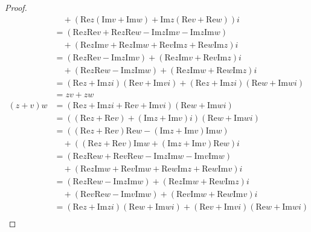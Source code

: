 \documentclass[dvipdfmx]{jsarticle}
\begin{document}
\begin{proof}
\begin{align*}
&\quad + \left( \mathrm{Re}z\left( \mathrm{Im}v + \mathrm{Im}w \right) + \mathrm{Im}z\left( \mathrm{Re}v + \mathrm{Re}w \right) \right)i\\
&= \left( \mathrm{Re}z\mathrm{Re}v + \mathrm{Re}z\mathrm{Re}w - \mathrm{Im}z\mathrm{Im}v - \mathrm{Im}z\mathrm{Im}w \right) \\
&\quad + \left( \mathrm{Re}z\mathrm{Im}v + \mathrm{Re}z\mathrm{Im}w + \mathrm{Re}v\mathrm{Im}z + \mathrm{Re}w\mathrm{Im}z \right)i\\
&= \left( \mathrm{Re}z\mathrm{Re}v - \mathrm{Im}z\mathrm{Im}v \right) + \left( \mathrm{Re}z\mathrm{Im}v + \mathrm{Re}v\mathrm{Im}z \right)i \\
&\quad + \left( \mathrm{Re}z\mathrm{Re}w - \mathrm{Im}z\mathrm{Im}w \right) + \left( \mathrm{Re}z\mathrm{Im}w + \mathrm{Re}w\mathrm{Im}z \right)i\\
&= \left( \mathrm{Re}z + \mathrm{Im}zi \right)\left( \mathrm{Re}v + \mathrm{Im}vi \right) + \left( \mathrm{Re}z + \mathrm{Im}zi \right)\left( \mathrm{Re}w + \mathrm{Im}wi \right)\\
&= zv + zw\\
(z + v)w &= \left( \mathrm{Re}z + \mathrm{Im}zi + \mathrm{Re}v + \mathrm{Im}vi \right)\left( \mathrm{Re}w + \mathrm{Im}wi \right)\\
&= \left( \left( \mathrm{Re}z + \mathrm{Re}v \right) + \left( \mathrm{Im}z + \mathrm{Im}v \right)i \right)\left( \mathrm{Re}w + \mathrm{Im}wi \right)\\
&= \left( \left( \mathrm{Re}z + \mathrm{Re}v \right)\mathrm{Re}w - \left( \mathrm{Im}z + \mathrm{Im}v \right)\mathrm{Im}w \right) \\
&\quad + \left( \left( \mathrm{Re}z + \mathrm{Re}v \right)\mathrm{Im}w + \left( \mathrm{Im}z + \mathrm{Im}v \right)\mathrm{Re}w \right)i\\
&= \left( \mathrm{Re}z\mathrm{Re}w + \mathrm{Re}v\mathrm{Re}w - \mathrm{Im}z\mathrm{Im}w - \mathrm{Im}v\mathrm{Im}w \right) \\
&\quad + \left( \mathrm{Re}z\mathrm{Im}w + \mathrm{Re}v\mathrm{Im}w + \mathrm{Re}w\mathrm{Im}z + \mathrm{Re}w\mathrm{Im}v \right)i\\
&= \left( \mathrm{Re}z\mathrm{Re}w - \mathrm{Im}z\mathrm{Im}w \right) + \left( \mathrm{Re}z\mathrm{Im}w + \mathrm{Re}w\mathrm{Im}z \right)i \\
&\quad+ \left( \mathrm{Re}v\mathrm{Re}w - \mathrm{Im}v\mathrm{Im}w \right) + \left( \mathrm{Re}v\mathrm{Im}w + \mathrm{Re}w\mathrm{Im}v \right)i\\
&= \left( \mathrm{Re}z + \mathrm{Im}zi \right)\left( \mathrm{Re}w + \mathrm{Im}wi \right) + \left( \mathrm{Re}v + \mathrm{Im}vi \right)\left( \mathrm{Re}w + \mathrm{Im}wi \right)\\

\end{align*}
\end{proof}
\end{document}
